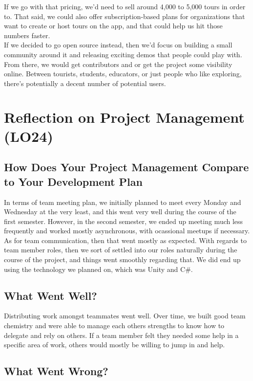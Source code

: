 \documentclass{article}
\begin{document}
If we go with that pricing, we’d need to sell around 4,000 to 5,000 tours in order to. That said, we could also offer subscription-based plans for organizations that want to create or host tours on the app, and that could help us hit those numbers faster. \\

If we decided to go open source instead, then we’d focus on building a small community around it and releasing exciting demos that people could play with. From there, we would get contributors and\/ or get the project some visibility online. Between tourists, students, educators, or just people who like exploring, there’s potentially a decent number of potential users.



\section{Reflection on Project Management (LO24)}

\subsection{How Does Your Project Management Compare to Your Development Plan}

In terms of team meeting plan, we initially planned to meet every Monday and Wednesday at the very least, and this went very well during the course of the first semester. However, in the second semester, we ended up meeting much less frequently and worked mostly asynchronous, with ocassional meetups if necessary. As for team communication, then that went mostly as expected. With regards to team member roles, then we sort of settled into our roles naturally during the course of the project, and things went smoothly regarding that. We did end up using the technology we planned on, which was Unity and C\#.

\subsection{What Went Well?}

Distributing work amongst teammates went well. Over time, we built good team chemistry and were able to manage each others strengths to know how to delegate and rely on others. If a team member felt they needed some help in a specific area of work, others would mostly be willing to jump in and help.

\subsection{What Went Wrong?}
\end{document}
